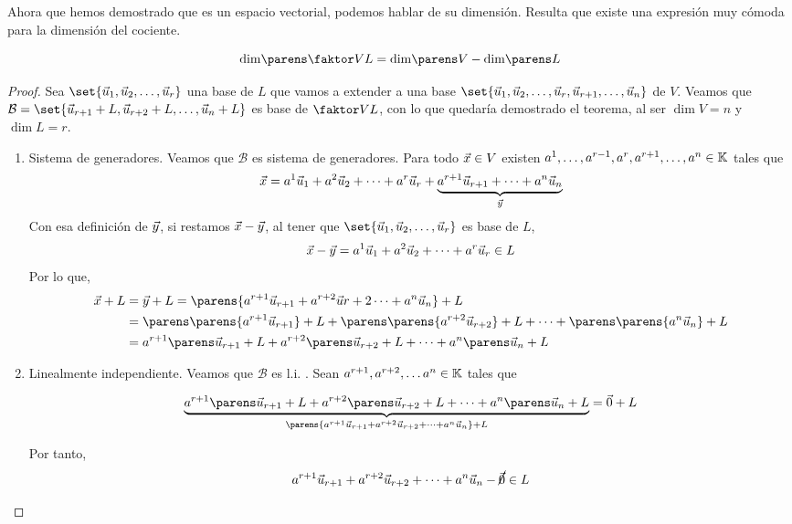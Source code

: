 \documentclass[../algebra_lineal.tex]{subfiles}
\begin{document}
Ahora que hemos demostrado que es un espacio vectorial, podemos hablar de su dimensión. Resulta que existe una expresión muy cómoda para la dimensión del cociente.

\begin{theorem}
    \label{dimension_cociente}
    \[
        \dim{\qs{V}{L}} = \dim{V} - \dim{L}
    \]
\end{theorem}

\begin{proof}
    Sea $\set{\vlst{u}{r}}$ una base de $L$ que vamos a extender a una base $\set{\vlst{u}{r}, \vu_{r+1}, \dots, \vu_n}$ de $V$. Veamos que $\mathcal{B} = \set{\vu_{r+1} + L, \vu_{r+2} + L, \dots, \vu_n + L}$ es base de $\qs{V}{L}$, con lo que quedaría demostrado el teorema, al ser $\dim{V} = n$ y $\dim{L} = r$.
    \begin{enumerate}
        \item Sistema de generadores. Veamos que $\mathcal{B}$ es sistema de generadores. Para todo $\vx \in V$ existen $\cslst{a}{n}{r} \in \K$ tales que
        \[
            \vx = \lincomb{a}{u}{r} + \underbrace{a^ {r+1} \vu_{r+1} + \dots + a^n \vu_n}_{\vy}
        \] 
        Con esa definición de $\vy$, si restamos $\vx - \vy$, al tener que $\set{\vlst{u}{r}}$ es base de $L$,
        \[
            \vx - \vy = \lincomb{a}{u}{r} \in L
        \]
        Por lo que,
        \begin{align*}
            \vx + L &= \vy + L = \parens{a^{r+1}\vu_{r+1} + a^{r+2}\vu{r+2} \dots + a^n \vu_n} + L \\
                    &= \ecl{\parens{a^{r+1}\vu_{r+1}}} + \ecl{\parens{a^{r+2}\vu_{r+2}}} + \dots + \ecl{\parens{a^{n}\vu_{n}}} \\
                    &= a^{r+1} \ecl{\vu_{r+1}} + a^{r+2} \ecl{\vu_{r+2}} + \dots + a^n \ecl{\vu_n}
        \end{align*}

        \item Linealmente independiente. Veamos que $\mathcal{B}$ es l.i. . Sean $a^{r+1}, a^{r+2}, \dots a^ n \in \K$ tales que 

        \[
            \underbrace{a^{r+1}\ecl{\vu_{r+1}} +  a^{r+2}\ecl{\vu_{r+2}} + \dots + a^{n}\ecl{\vu_{n}}}_{\parens{a^{r+1}\vu_{r+1} + a^{r+2}\vu_{r+2} + \dots + a^{n}\vu_{n}} + L} = \zv + L
        \]

        Por tanto,
        \[
            a^{r+1}\vu_{r+1} + a^{r+2}\vu_{r+2} + \dots + a^{n}\vu_{n} - \cancel{\zv} \in L
        \]


\end{enumerate}
\end{proof}
\end{document}

